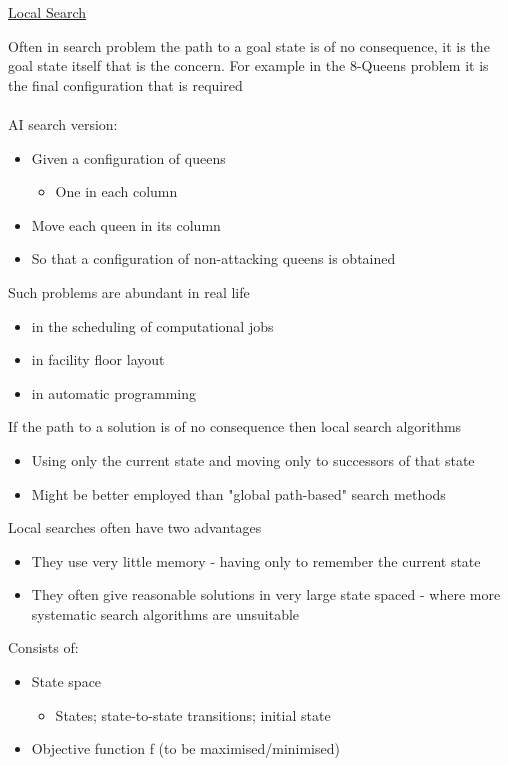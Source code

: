 \documentclass{article}[18pt]
\begin{document}
\begin{center}
\underline{\huge Local Search}
\end{center}
Often in search problem the path to a goal state is of no consequence, it is the goal state itself that is the concern. For example in the 8-Queens problem it is the final configuration that is required\\
\\
AI search version:
\begin{itemize}
	\item Given a configuration of queens
	\begin{itemize}
		\item One in each column
	\end{itemize}
	\item Move each queen in its column
	\item So that a configuration of non-attacking queens is obtained
\end{itemize}
Such problems are abundant in real life
\begin{itemize}
	\item in the scheduling of computational jobs
	\item in facility floor layout
	\item in automatic programming
\end{itemize}
If the path to a solution is of no consequence then local search algorithms
\begin{itemize}
	\item Using only the current state and moving only to successors of that state
	\item Might be better employed than "global path-based" search methods
\end{itemize}
Local searches often have two advantages
\begin{itemize}
	\item They use very little memory - having only to remember the current state
	\item They often give reasonable solutions in very large state spaced - where more systematic search algorithms are unsuitable
\end{itemize}
\begin{defin}
Consists of:
\begin{itemize}
	\item State space
	\begin{itemize}
		\item States; state-to-state transitions; initial state
	\end{itemize}
	\item Objective function f (to be maximised/minimised)
\end{itemize}
\end{defin}
\end{document}

